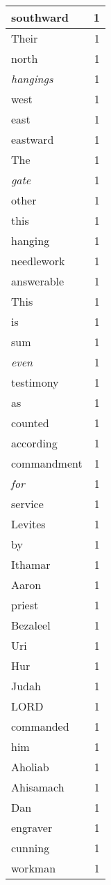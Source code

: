 \begin{center}
\begin{longtable}{l|r}
southward & 1 \\ \hline
Their & 1 \\ \hline
north & 1 \\ \hline
\emph{hangings} & 1 \\ \hline
west & 1 \\ \hline
east & 1 \\ \hline
eastward & 1 \\ \hline
The & 1 \\ \hline
\emph{gate} & 1 \\ \hline
other & 1 \\ \hline
this & 1 \\ \hline
hanging & 1 \\ \hline
needlework & 1 \\ \hline
answerable & 1 \\ \hline
This & 1 \\ \hline
is & 1 \\ \hline
sum & 1 \\ \hline
\emph{even} & 1 \\ \hline
testimony & 1 \\ \hline
as & 1 \\ \hline
counted & 1 \\ \hline
according & 1 \\ \hline
commandment & 1 \\ \hline
\emph{for} & 1 \\ \hline
service & 1 \\ \hline
Levites & 1 \\ \hline
by & 1 \\ \hline
Ithamar & 1 \\ \hline
Aaron & 1 \\ \hline
priest & 1 \\ \hline
Bezaleel & 1 \\ \hline
Uri & 1 \\ \hline
Hur & 1 \\ \hline
Judah & 1 \\ \hline
LORD & 1 \\ \hline
commanded & 1 \\ \hline
him & 1 \\ \hline
Aholiab & 1 \\ \hline
Ahisamach & 1 \\ \hline
Dan & 1 \\ \hline
engraver & 1 \\ \hline
cunning & 1 \\ \hline
workman & 1 \\ \hline

\end{longtable}
\end{center}

